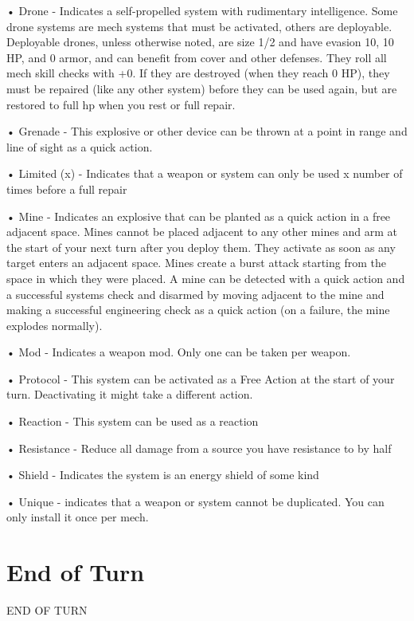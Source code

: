 •  \hypertarget{Drone}{Drone} - Indicates a self-propelled system with rudimentary intelligence. Some drone systems
  are mech systems that must be activated, others are deployable. Deployable drones, unless
  otherwise noted, are size 1/2 and have evasion 10, 10 HP, and 0 armor, and can benefit from
  cover and other defenses. They roll all mech skill checks with +0. If they are destroyed (when
  they reach 0 HP), they must be repaired (like any other system) before they can be used again,
  but are restored to full hp when you rest or full repair.

•  \hypertarget{Grenade}{Grenade} - This explosive or other device can be thrown at a point in range and line of sight as
  a quick action.

•  \hypertarget{Limited}{Limited (x)} - Indicates that a weapon or system can only be used x number of times before a
  full repair

•  \hypertarget{Mine}{Mine} - Indicates an explosive that can be planted as a quick action in a free adjacent space.
  Mines cannot be placed adjacent to any other mines and arm at the start of your next turn after
  you deploy them. They activate as soon as any target enters an adjacent space. Mines create a
  burst attack starting from the space in which they were placed. A mine can be detected with a
  quick action and a successful systems check and disarmed by moving adjacent to the mine
  and making a successful engineering check as a quick action (on a failure, the mine explodes
  normally).

•  Mod - Indicates a weapon mod. Only one can be taken per weapon.

•  \hypertarget{Protocol}{Protocol} - This system can be activated as a Free Action at the start of your turn. Deactivating
  it might take a different action.

•  \hypertarget{Reaction}{Reaction} - This system can be used as a reaction

•  \hypertarget{Resistance}{Resistance} - Reduce all damage from a source you have resistance to by half

•  \hypertarget{Shield}{Shield} - Indicates the system is an energy shield of some kind

•  \hypertarget{Unique}{Unique} - indicates that a weapon or system cannot be duplicated. You can only install it once
  per mech.

\section{End of Turn}
\hypertarget{EndOfTurn}{END OF TURN}


